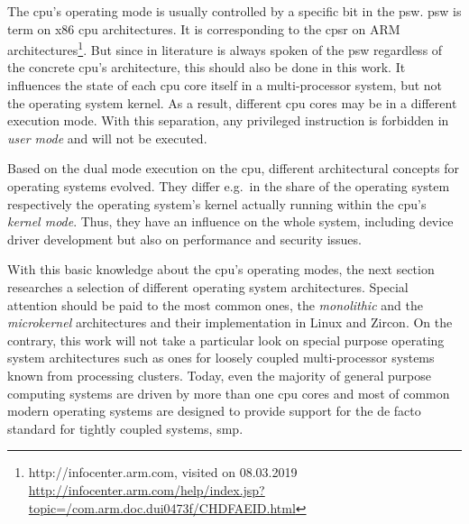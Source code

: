 The \ac{cpu}'s operating mode is usually controlled by a specific bit in the \ac{psw}\cite{tanenbaum-modern-operating-systems}.
\ac{psw} is term on x86 \ac{cpu} architectures. 
It is corresponding to the \ac{cpsr} on ARM architectures\footnote{http://infocenter.arm.com, visited on 08.03.2019 \url{http://infocenter.arm.com/help/index.jsp?topic=/com.arm.doc.dui0473f/CHDFAEID.html}}.
But since in literature is always spoken of the \ac{psw} regardless of the concrete \ac{cpu}'s architecture, this should also be done in this work.
It influences the state of each \ac{cpu} core itself in a multi-processor system, but not the operating system kernel.
As a result, different \ac{cpu} cores may be in a different execution mode\cite{lfd430}.
With this separation, any privileged instruction is forbidden in \textit{user mode} and will not be executed.

Based on the dual mode execution on the \ac{cpu}, different architectural concepts for operating systems evolved.
They differ e.g.\ in the share of the operating system respectively the operating system's kernel actually running within the \ac{cpu}'s \textit{kernel mode}. 
Thus, they have an influence on the whole system, including device driver development but also on performance and security issues.

With this basic knowledge about the \ac{cpu}'s operating modes, the next section researches a selection of different operating system architectures.
Special attention should be paid to the most common ones, the \textit{monolithic} and the \textit{microkernel} architectures and their implementation in Linux and Zircon.
On the contrary, this work will not take a particular look on special purpose operating system architectures such as ones for loosely coupled multi-processor systems known from processing clusters.
Today, even the majority of general purpose computing systems are driven by more than one \ac{cpu} cores and most of common modern operating systems are designed to provide support for the de facto standard for tightly coupled systems, \ac{smp}.


